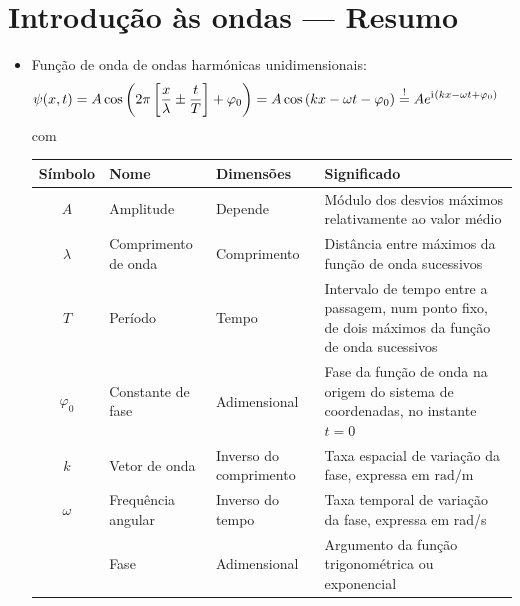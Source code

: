 \newpage
\section{Introdução às ondas --- Resumo}
\begin{itemize}
\item
    Função de onda de ondas harmónicas unidimensionais:
    \begin{align*}
      \psi(x,t)&=A\cos\left(2\pi\left[\frac{x}{\lambda}\pm\frac{t}{T}\right]+
                \varphi_0\right)
               =A\cos\left(kx-\omega t-\varphi_0\right)\stackrel{!}{=}
               Ae^{\text{i}\mkern1mu (kx-\omega t+\varphi_0)}
    \end{align*}
    com
    \begin{center}
    \begin{tabular}{c|l|l|l}
    \hline
    \rule{0mm}{3ex} Símbolo&Nome&Dimensões&Significado\\[0.5ex]
    \hline
    $A$ & Amplitude & Depende&
        \parbox[t]{0.3\textwidth}{\rule{0mm}{4ex}Módulo dos desvios máxi\-mos
        relativamente ao valor médio}\\
    $\lambda$ & Comprimento de onda & Comprimento &
        \parbox[t]{0.3\textwidth}{\rule{0mm}{4ex}Distância entre máximos da função
        de onda sucessivos} \\
    $T$ & Período & Tempo &
        \parbox[t]{0.3\textwidth}{\rule{0mm}{4ex}Intervalo de tempo entre a
        passagem, num ponto fixo, de dois máximos da função de onda sucessivos}
    \\
    $\varphi_0$&Constante de fase&Adimensional&
        \parbox[t]{0.3\textwidth}{\rule{0mm}{4ex}Fase da função de onda na
        origem do sistema de coordenadas, no instante $t=0$}\\
    $k$&Vetor de onda&
        \parbox[t]{0.2\textwidth}{Inverso do comprimento}&
        \parbox[t]{0.3\textwidth}{\rule{0mm}{4ex}Taxa espacial de variação da fase,
        expressa em $\text{rad}/\text{m}$}\\
    $\omega$&Frequência angular &
        \parbox[t]{0.2\textwidth}{Inverso do tempo}&
        \parbox[t]{0.3\textwidth}{\rule{0mm}{4ex}Taxa temporal de variação da
        fase, expressa em rad/s}
        \\
        &Fase& Adimensional &\parbox[t]{0.3\textwidth}{\rule{0mm}{4ex}%
          Argumento da função trigonométrica ou exponencial}
    \\[3ex]
    \hline
    \end{tabular}
    \end{center}

\end{itemize}
